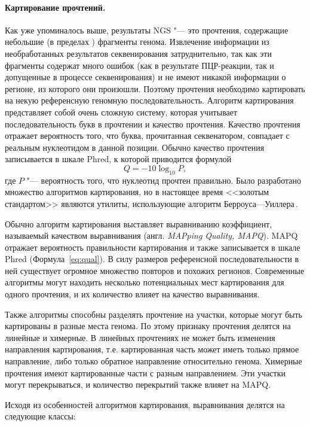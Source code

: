 \documentclass[a4paper,14pt]{extarticle}
\newcommand{\ecitep}[1]{\textenglish{\citep{#1}}}
\newcommand{\formularef}[1]{Формула~\ref{#1}}
\newcommand{\engterm}[1]{англ. \textenglish{\textit{#1}}}
\begin{document}
\paragraph{Картирование прочтений.}
Как уже упоминалось выше, результаты NGS "--- это прочтения, содержащие небольшие (в пределах ) фрагменты генома.
Извлечение информации из необработанных результатов секвенирования затруднительно, так как эти фрагменты содержат много ошибок (как в результате ПЦР\hyp{}реакции, так и допущенные в процессе секвенирования) и не имеют никакой информации о регионе, из которого они произошли.
Поэтому прочтения необходимо картировать на некую референсную геномную последовательность.
Алгоритм картирования представляет собой очень сложную систему, которая учитывает последовательность букв в прочтении и качество прочтения.
Качество прочтения отражает вероятность того, что буква, прочитанная секвенатором, совпадает с реальным нуклеотидом в данной позиции.
Обычно качество прочтения записывается в шкале Phred, к которой приводится формулой \begin{equation}Q = -10\log_{10}P,\label{eq:qual}\end{equation} где $P$ "--- вероятность того, что нуклеотид прочтен правильно.
Было разработано множество алгоритмов картирования, но в настоящее время <<золотым стандартом>> являются утилиты, использующие алгоритм Берроуса---Уилле\-ра\,\ecitep{Burrows_1994}.

Обычно алгоритм картирования выставляет выравниванию коэффициент, называемый качеством выравнивания (\engterm{MAPping Quality, MAPQ}).
MAPQ отражает вероятность правильности картирования и также записывается в шкале Phred (\formularef{eq:qual}).
В силу размеров референсной последовательности в ней существует огромное множество повторов и похожих регионов.
Современные алгоритмы могут находить несколько потенциальных мест картирования для одного прочтения, и их количество влияет на качество выравнивания.

Также алгоритмы способны разделять прочтение на участки, которые могут быть картированы в разные места генома.
По этому признаку прочтения делятся на линейные и химерные.
В линейных прочтениях не может быть изменения направления картирования, т.е. картированная часть может иметь только прямое направление, либо только обратное направление относительно генома.
Химерные прочтения имеют картированные части с разным направлением.
Эти участки могут перекрываться, и количество перекрытий также влияет на MAPQ.

Исходя из особенностей алгоритмов картирования, выравнивания делятся на следующие классы:
\end{document}
